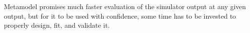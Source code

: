 Metamodel promises much faster evaluation of the simulator output at any given output, but for it to be used with confidence, some time has to be invested to properly design, fit, and validate it.

